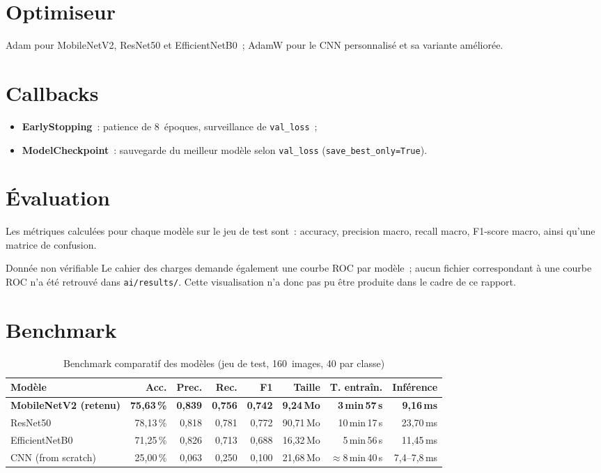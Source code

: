 \section{Optimiseur}

Adam pour MobileNetV2, ResNet50 et EfficientNetB0~; AdamW pour le CNN personnalis\'e et sa variante am\'elior\'ee.

\section{Callbacks}

\begin{itemize}
  \item \textbf{EarlyStopping}~: patience de 8~\'epoques, surveillance de \texttt{val\_loss}~;
  \item \textbf{ModelCheckpoint}~: sauvegarde du meilleur mod\`ele selon \texttt{val\_loss} (\texttt{save\_best\_only=True}).
\end{itemize}

\section{\'Evaluation}

Les m\'etriques calcul\'ees pour chaque mod\`ele sur le jeu de test sont~: accuracy, precision macro, recall macro, F1-score macro, ainsi qu'une matrice de confusion.

\begin{noteflag}{Donn\'ee non v\'erifiable}
Le cahier des charges demande \'egalement une courbe ROC par mod\`ele~; aucun fichier correspondant \`a une courbe ROC n'a \'et\'e retrouv\'e dans \texttt{ai/results/}. Cette visualisation n'a donc pas pu \^etre produite dans le cadre de ce rapport.
\end{noteflag}

\section{Benchmark}

\begin{table}[H]
\centering
\small
\caption{Benchmark comparatif des mod\`eles (jeu de test, 160~images, 40 par classe)}
\label{tab:benchmark}
\begin{tabularx}{\textwidth}{lrrrrrrr}
\toprule
Mod\`ele & Acc. & Prec. & Rec. & F1 & Taille & T. entra\^in. & Inf\'erence \\
\midrule
\textbf{MobileNetV2 (retenu)} & \textbf{75,63\,\%} & \textbf{0,839} & \textbf{0,756} & \textbf{0,742} & \textbf{9,24\,Mo} & \textbf{3\,min\,57\,s} & \textbf{9,16\,ms} \\
ResNet50 & 78,13\,\% & 0,818 & 0,781 & 0,772 & 90,71\,Mo & 10\,min\,17\,s & 23,70\,ms \\
EfficientNetB0 & 71,25\,\% & 0,826 & 0,713 & 0,688 & 16,32\,Mo & 5\,min\,56\,s & 11,45\,ms \\
CNN (from scratch) & 25,00\,\% & 0,063 & 0,250 & 0,100 & 21,68\,Mo & $\approx$8\,min\,40\,s & 7,4--7,8\,ms \\
\bottomrule
\end{tabularx}
\end{table}

